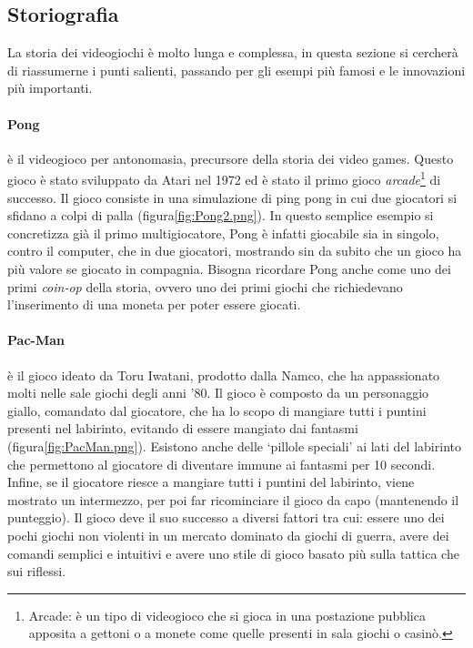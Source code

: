     \subsection{Storiografia}\label{subsec:VideogiochiStoriografia}
        La storia dei videogiochi è molto lunga e complessa, in questa sezione si cercherà di riassumerne i punti salienti, passando per gli esempi più famosi e le
        innovazioni più importanti.

        \paragraph{Pong} è il videogioco per antonomasia, precursore della storia dei video games. Questo gioco è stato sviluppato da Atari nel 1972 ed è stato il primo gioco 
            \textit{arcade}\footnote{Arcade: è un tipo di videogioco che si gioca in una postazione pubblica apposita a gettoni o a monete come quelle presenti in sala giochi o casinò.}
            di successo. Il gioco consiste in una simulazione di ping pong in cui due giocatori si sfidano a colpi di palla (figura\ref{fig:Pong2.png}). In questo semplice esempio si concretizza già il primo 
            multigiocatore, Pong è infatti giocabile sia in singolo, contro il computer, che in due giocatori, mostrando sin da subito che un gioco ha più valore se giocato in compagnia. 
            Bisogna ricordare Pong anche come uno dei primi \textit{coin-op} della storia, ovvero uno dei primi giochi che richiedevano l'inserimento di una moneta per poter 
            essere giocati.

        \paragraph{Pac-Man} è il gioco ideato da Toru Iwatani, prodotto dalla Namco, che ha appassionato molti nelle sale giochi degli anni '80. Il gioco è composto da un personaggio giallo,
            comandato dal giocatore, che ha lo scopo di mangiare tutti i puntini presenti nel labirinto, evitando di essere mangiato dai fantasmi (figura\ref{fig:PacMan.png}). Esistono 
            anche delle `pillole speciali' ai lati del labirinto che permettono al giocatore di diventare immune ai fantasmi per 10 secondi. Infine, se il giocatore riesce a mangiare tutti
            i puntini del labirinto, viene mostrato un intermezzo, per poi far ricominciare il gioco da capo (mantenendo il punteggio). Il gioco deve il suo successo a diversi fattori tra cui: 
            essere uno dei pochi giochi non violenti in un mercato dominato da giochi di guerra, avere dei comandi semplici e intuitivi e avere uno stile di gioco basato più sulla tattica 
            che sui riflessi\cite{Uston1982}.

